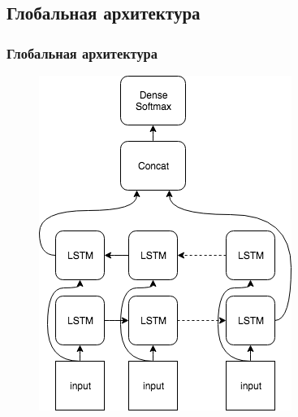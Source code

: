 \documentclass[russian]{beamer}
\begin{document}
\subsection {Глобальная архитектура}
\begin{frame}
\frametitle{Глобальная архитектура} 
\begin{figure}[H]
	\begin{center}
		\includegraphics[width=0.5\linewidth]{Baseline}
	\end{center}
\end{figure}
\end{frame}
\end{document}
